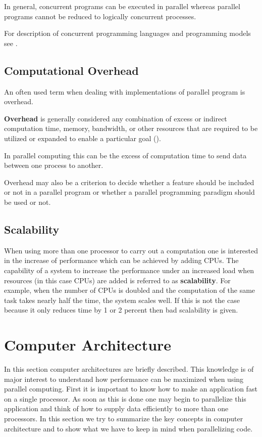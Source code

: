 In general, concurrent programs can be executed 
in parallel whereas parallel programs cannot be reduced to logically
concurrent processes. 

For description of concurrent programming languages and programming
models see \cite{gehani88:concurrentprog}.

\subsection{Computational Overhead}

An often used term when dealing with implementations of parallel
program is overhead.

\textbf{Overhead} is generally considered any combination of excess or indirect
computation time, memory, bandwidth, or other
resources that are required to be utilized or expanded to enable a
particular goal (\cite{wiki:overhead}).

In parallel computing this can be the excess of computation time to
send data between one process to another.

Overhead may also be a criterion to decide whether a feature should be
included or not in a parallel program or whether a parallel
programming paradigm should be used or not.

\subsection{Scalability}

When using more than one processor to carry out a computation one is
interested in the increase of performance which can be achieved by
adding CPUs. The capability of a system to increase the performance
under an increased load when resources (in this case CPUs) are added
is referred to as \textbf{scalability}. For example, when the number of
CPUs is doubled and the computation of the same task takes nearly half
the time, the 
system scales well. If this is not the case because it only reduces
time by 1 or 2 percent then bad scalability is given. 

\section{Computer Architecture}

In this section computer architectures are briefly described. This
knowledge is of major interest to
understand how performance can be maximized when using parallel
computing. First it is important to know how to make an application fast
on a single processor. As soon as this is done one may begin to
parallelize this application and think of how to supply data efficiently to
more than one processors. In this section we try to summarize the key
concepts in computer architecture and to show what we have to keep in
mind when parallelizing code.


